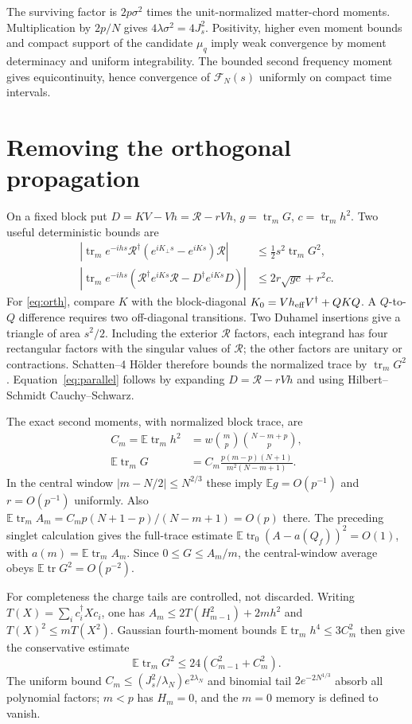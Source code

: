 \documentclass[11pt,a4paper]{article}
\newcommand{\EE}{\mathbb E}
\newcommand{\trm}{\operatorname{tr}_m}
\newcommand{\trz}{\operatorname{tr}_0}
\DeclareMathOperator{\tr}{tr}
\newcommand{\mcR}{\mathcal R}
\begin{document}
The surviving factor is $2p\sigma^2$ times the unit-normalized
matter-chord moments. Multiplication by $2p/N$ gives
$4\lambda\sigma^2=4J_s^2$. Positivity, higher even moment bounds
and compact support of the candidate $\mu_q$ imply weak convergence
by moment determinacy and uniform integrability. The bounded second
frequency moment gives equicontinuity, hence convergence of
$\mathcal F_N(s)$ uniformly on compact time intervals.

\newpage
\section{Removing the orthogonal propagation}
On a fixed block put $D=KV-Vh=\mcR-rVh$, $g=\trm G$,
$c=\trm h^2$. Two useful deterministic bounds are
\begin{align}
 \left|\trm e^{-ihs}\mcR^\dagger
 (e^{iK_\perp s}-e^{iKs})\mcR\right|
 &\leq\tfrac12s^2\trm G^2,\label{eq:orth}\\
 \left|\trm e^{-ihs}
 (\mcR^\dagger e^{iKs}\mcR-D^\dagger e^{iKs}D)\right|
 &\leq2r\sqrt{gc}+r^2c.\label{eq:parallel}
\end{align}
For \eqref{eq:orth}, compare $K$ with the block-diagonal
$K_0=Vh_{\rm eff}V^\dagger+QKQ$. A $Q$-to-$Q$ difference requires
two off-diagonal transitions. Two Duhamel insertions give a triangle
of area $s^2/2$. Including the exterior $\mcR$ factors, each integrand
has four rectangular factors with the singular values of $\mcR$;
the other factors are unitary or contractions. Schatten--4 H\"older
therefore bounds the normalized trace by $\trm G^2$.
Equation~\eqref{eq:parallel} follows by expanding
$D=\mcR-rVh$ and using Hilbert--Schmidt Cauchy--Schwarz.

The exact second moments, with normalized block trace, are
\begin{align}
 C_m=\EE\trm h^2&=w\binom mp\binom{N-m+p}p,\\
 \EE\trm G&=C_m\frac{p(m-p)(N+1)}{m^2(N-m+1)}.
\end{align}
In the central window $|m-N/2|\leq N^{2/3}$ these imply
$\EE g=O(p^{-1})$ and $r=O(p^{-1})$ uniformly. Also
$\EE\trm A_m=C_mp(N+1-p)/(N-m+1)=O(p)$ there.
The preceding singlet calculation gives the full-trace estimate
$\EE\trz(A-a(Q_f))^2=O(1)$, with $a(m)=\EE\trm A_m$.
Since $0\leq G\leq A_m/m$, the central-window average obeys
$\EE\tr G^2=O(p^{-2})$.

For completeness the charge tails are controlled, not discarded.
Writing $T(X)=\sum_i c_i^\dagger Xc_i$, one has
$A_m\leq2T(H_{m-1}^2)+2mh^2$ and
$T(X)^2\leq mT(X^2)$. Gaussian fourth-moment bounds
$\EE\trm h^4\leq3C_m^2$ then give the conservative estimate
\begin{equation}
 \EE\trm G^2\leq24(C_{m-1}^2+C_m^2).
\end{equation}
The uniform bound $C_m\leq(J_s^2/\lambda_N)e^{2\lambda_N}$ and
binomial tail $2e^{-2N^{1/3}}$ absorb all polynomial factors;
$m<p$ has $H_m=0$, and the $m=0$ memory is defined to vanish.
\end{document}
